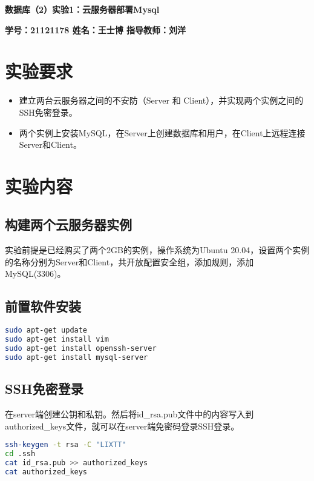 \documentclass{article}
\begin{document}
 \pingfang
\begin{center}
    \textbf{\huge 数据库（2）实验1：云服务器部署Mysql}
\end{center}
\begin{center}
    \textbf{\large \textbf{学号：21121178 \quad 姓名：王士博 \quad 指导教师：刘洋}}
\end{center}
\hrulefill

\section{实验要求}

\begin{itemize}
  \item 建立两台云服务器之间的不安防（Server 和 Client），并实现两个实例之间的SSH免密登录。
  \item 两个实例上安装MySQL，在Server上创建数据库和用户，在Client上远程连接Server和Client。
\end{itemize}

\section{实验内容}

\subsection{构建两个云服务器实例}

实验前提是已经购买了两个2GB的实例，操作系统为Ubuntu 20.04，设置两个实例的名称分别为Server和Client，共开放配置安全组，添加规则，添加MySQL(3306)。

\subsection{前置软件安装}

\begin{lstlisting}[language=bash]
sudo apt-get update
sudo apt-get install vim
sudo apt-get install openssh-server
sudo apt-get install mysql-server
\end{lstlisting}

\subsection{SSH免密登录}

在server端创建公钥和私钥。然后将id\_rsa.pub文件中的内容写入到authorized\_keys文件，就可以在server端免密码登录SSH登录。

\begin{lstlisting}[language=bash]
ssh-keygen -t rsa -C "LIXTT"
cd .ssh
cat id_rsa.pub >> authorized_keys
cat authorized_keys
\end{lstlisting}
\end{document}
